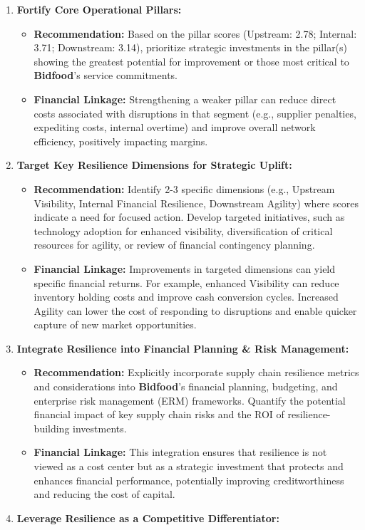 \documentclass[
  oneside,
  open=any,
  fontsize=11pt]{scrbook}
\providecommand{\tightlist}{%
  \setlength{\itemsep}{0pt}\setlength{\parskip}{0pt}}
\begin{document}
\begin{enumerate}
\def\labelenumi{\arabic{enumi}.}
\tightlist
\item
  \textbf{Fortify Core Operational Pillars:}

  \begin{itemize}
  \tightlist
  \item
    \textbf{Recommendation:} Based on the pillar scores (Upstream: 2.78;
    Internal: 3.71; Downstream: 3.14), prioritize strategic investments
    in the pillar(s) showing the greatest potential for improvement or
    those most critical to \textbf{Bidfood}'s service commitments.
  \item
    \textbf{Financial Linkage:} Strengthening a weaker pillar can reduce
    direct costs associated with disruptions in that segment (e.g.,
    supplier penalties, expediting costs, internal overtime) and improve
    overall network efficiency, positively impacting margins.
  \end{itemize}
\item
  \textbf{Target Key Resilience Dimensions for Strategic Uplift:}

  \begin{itemize}
  \tightlist
  \item
    \textbf{Recommendation:} Identify 2-3 specific dimensions (e.g.,
    Upstream Visibility, Internal Financial Resilience, Downstream
    Agility) where scores indicate a need for focused action. Develop
    targeted initiatives, such as technology adoption for enhanced
    visibility, diversification of critical resources for agility, or
    review of financial contingency planning.
  \item
    \textbf{Financial Linkage:} Improvements in targeted dimensions can
    yield specific financial returns. For example, enhanced Visibility
    can reduce inventory holding costs and improve cash conversion
    cycles. Increased Agility can lower the cost of responding to
    disruptions and enable quicker capture of new market opportunities.
  \end{itemize}
\item
  \textbf{Integrate Resilience into Financial Planning \& Risk
  Management:}

  \begin{itemize}
  \tightlist
  \item
    \textbf{Recommendation:} Explicitly incorporate supply chain
    resilience metrics and considerations into \textbf{Bidfood}'s
    financial planning, budgeting, and enterprise risk management (ERM)
    frameworks. Quantify the potential financial impact of key supply
    chain risks and the ROI of resilience-building investments.
  \item
    \textbf{Financial Linkage:} This integration ensures that resilience
    is not viewed as a cost center but as a strategic investment that
    protects and enhances financial performance, potentially improving
    creditworthiness and reducing the cost of capital.
  \end{itemize}
\item
  \textbf{Leverage Resilience as a Competitive Differentiator:}


\end{enumerate}
\end{document}
